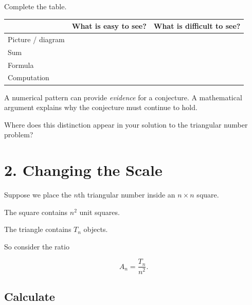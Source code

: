 \documentclass[11pt]{article}
\begin{document}
Complete the table.

\begin{center}
\begin{tabularx}{0.95\textwidth}{@{}p{}XX@{}}
\toprule
& \textbf{What is easy to see?}
& \textbf{What is difficult to see?}
\\
\midrule

Picture / diagram
&
\vspace{0.42in}
&
\\
\midrule

Sum
&
\vspace{0.42in}
&
\\
\midrule

Formula
&
\vspace{0.42in}
&
\\
\midrule

Computation
&
\vspace{0.42in}
&
\\

\bottomrule
\end{tabularx}
\end{center}


\begin{reflection}
A numerical pattern can provide \emph{evidence} for a conjecture.
A mathematical argument explains why the conjecture must continue
to hold.

Where does this distinction appear in your solution to the triangular
number problem?
\end{reflection}

\vspace{0.55in}


\section{2. Changing the Scale}

Suppose we place the \(n\)th triangular number inside an
\(n\times n\) square.

The square contains \(n^2\) unit squares.

The triangle contains \(T_n\) objects.

So consider the ratio

\[
A_n=\frac{T_n}{n^2}.
\]


\subsection*{Calculate}
\end{document}

